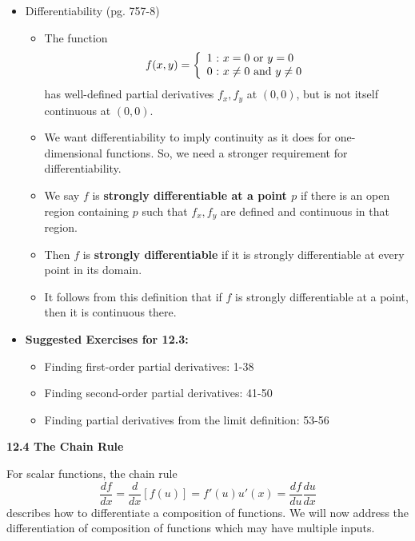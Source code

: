 \documentclass[12pt]{article}
\theoremstyle{plain}
\theoremstyle{definition}
\theoremstyle{remark}
\begin{document}
\begin{itemize}
	\item Differentiability (pg. 757-8)
	
		\begin{itemize}
		\item The function
	\[
	f(x,y) = \left\{
	\begin{array}{l@{\ :\ }l}
	1 & x=0 \text{ or } y=0 \\
	0 & x\not=0 \text{ and } y\not=0
	\end{array}
	\right.
	\]
		has well-defined partial derivatives $f_x,f_y$ at $(0,0)$, but is not itself continuous at $(0,0)$.
		\item We want differentiability to imply continuity as it does for one-dimensional functions. So, we need a stronger requirement for differentiability.
		\item We say $f$ is \textbf{strongly differentiable at a point $p$} if there is an open region containing $p$ such that $f_x,f_y$ are defined and continuous in that region.
		\item Then $f$ is \textbf{strongly differentiable} if it is strongly differentiable at every point in its domain.
		\item It follows from this definition that if $f$ is strongly differentiable at a point, then it is continuous there.
		\end{itemize}
	
	\item \textbf{Suggested Exercises for 12.3:}
	
		\begin{itemize}
		\item Finding first-order partial derivatives: 1-38
		\item Finding second-order partial derivatives: 41-50
		\item Finding partial derivatives from the limit definition: 53-56
		\end{itemize}
	
	\end{itemize}
	
	\newpage
	
	\centerline{\bf 12.4 The Chain Rule}
	
	For scalar functions, the chain rule \[\frac{df}{dx}=\frac{d}{dx}[f(u)]=f'(u)u'(x)=\frac{df}{du}\frac{du}{dx}\] describes how to differentiate a composition of functions.  We will now address the differentiation of composition of functions which may have multiple inputs.
	
\end{document}
